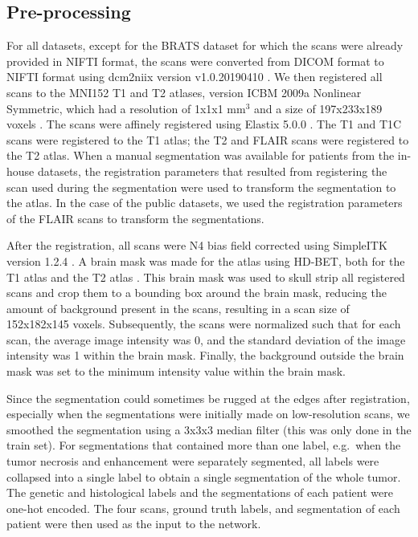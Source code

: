 \subsection{Pre-processing}
For all datasets, except for the \gls{BRATS} dataset for which the scans were already provided in \acrshort{NIFTI} format, the scans were converted from DICOM format to \acrshort{NIFTI} format using dcm2niix version v1.0.20190410 \autocite{li2016first}.
We then registered all scans to the MNI152 \gls{T1} and \gls{T2} atlases, version ICBM 2009a Nonlinear Symmetric, which had a resolution of 1x1x1 mm$^3$ and a size of 197x233x189 voxels \autocite{fonov2011unbiased, fonov2009unbiased}.
The scans were affinely registered using Elastix 5.0.0 \autocite{klein2010elastix, shamonin2014fast}.
The \gls{T1} and \gls{T1C} scans were registered to the \gls{T1} atlas; the \gls{T2} and \gls{FLAIR} scans were registered to the \gls{T2} atlas.
When a manual segmentation was available for patients from the in-house datasets, the registration parameters that resulted from registering the scan used during the segmentation were used to transform the segmentation to the atlas.
In the case of the public datasets, we used the registration parameters of the \gls{FLAIR} scans to transform the segmentations.

After the registration, all scans were N4 bias field corrected using SimpleITK version 1.2.4 \autocite{lowekamp2013simpleitk}.
A brain mask was made for the atlas using HD-BET, both for the \gls{T1} atlas and the \gls{T2} atlas \autocite{isensee2019hdbet}.
This brain mask was used to skull strip all registered scans and crop them to a bounding box around the brain mask, reducing the amount of background present in the scans, resulting in a scan size of 152x182x145 voxels.
Subsequently, the scans were normalized such that for each scan, the average image intensity was 0, and the standard deviation of the image intensity was 1 within the brain mask.
Finally, the background outside the brain mask was set to the minimum intensity value within the brain mask.

Since the segmentation could sometimes be rugged at the edges after registration, especially when the segmentations were initially made on low-resolution scans, we smoothed the segmentation using a 3x3x3 median filter (this was only done in the train set).
For segmentations that contained more than one label, e.g.\ when the \gls{tumor} necrosis and enhancement were separately segmented, all labels were collapsed into a single label to obtain a single segmentation of the whole \gls{tumor}.
The genetic and histological labels and the segmentations of each patient were one-hot encoded.
The four scans, ground truth labels, and segmentation of each patient were then used as the input to the network.


